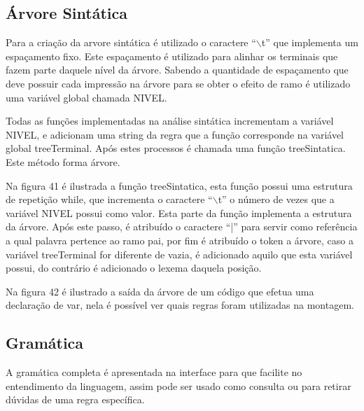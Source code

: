 \documentclass[12pt,oneside,a4paper,chapter=TITLE,section=TITLE,sumario=tradicional]{abntex2}
\begin{document}
\subsection{Árvore Sintática}
\label{subsec:arvore}

Para a criação da arvore sintática é utilizado o caractere “$\backslash$t” que implementa um espaçamento fixo. Este espaçamento é utilizado para alinhar os terminais que fazem parte daquele nível da árvore.  Sabendo a quantidade de espaçamento que deve possuir cada impressão na árvore para se obter o efeito de ramo é utilizado uma variável global chamada NIVEL.

Todas as funções implementadas na análise sintática incrementam a variável NIVEL, e adicionam uma string da regra que a função corresponde na variável global treeTerminal. Após estes processos é chamada uma função treeSintatica. Este método forma árvore.

Na figura 41 é ilustrada a função treeSintatica, esta função possui uma estrutura de repetição while, que incrementa o caractere “$\backslash$t” o número de vezes que a variável NIVEL possui como valor. Esta parte da função implementa a estrutura da árvore. Após este passo, é atribuído o caractere “|” para servir como referência a qual palavra pertence ao ramo pai, por fim é atribuído o token a árvore, caso a variável treeTerminal for diferente de vazia, é adicionado aquilo que esta variável possui, do contrário é adicionado o lexema daquela posição. 

\begin{figure}[htb]
\end{figure} 

Na figura 42 é ilustrado a saída da árvore de um código que efetua uma declaração de var, nela é possível ver quais regras foram utilizadas na montagem. 

\begin{figure}[htb]
\end{figure} 

\subsection{Gramática}
\label{subsec:gramatica}

A gramática completa é apresentada na interface para que facilite no entendimento da linguagem, assim pode ser usado como consulta ou para retirar dúvidas de uma regra específica. 
\end{document}
